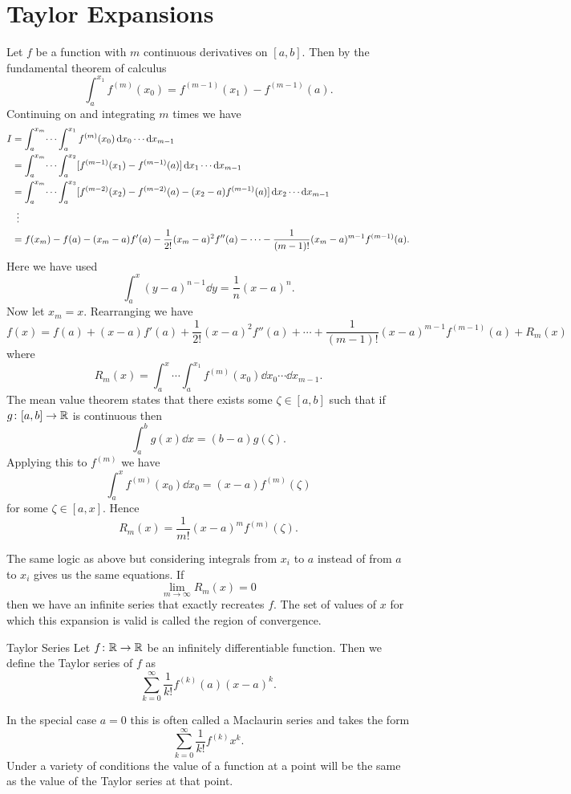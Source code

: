 \section{Taylor Expansions}
Let \(f\) be a function with \(m\) continuous derivatives on \([a, b]\).
Then by the fundamental theorem of calculus
\[\int_a^{x_1}f^{(m)}(x_0) = f^{(m-1)}(x_1) - f^{(m-1)}(a).\]
Continuing on and integrating \(m\) times we have
\begin{align*}
    I &= \int_{a}^{x_m} \dotsi \int_{a}^{x_1} f^{(m)}(x_0)\dd{x_0}\dotsm\dd{x_{m-1}}\\
    &= \int_{a}^{x_m} \dotsi \int_{a}^{x_2} [f^{(m-1)}(x_1) - f^{(m-1)}(a)]\dd{x_1}\dotsm\dd{x_{m-1}}\\
    &= \int_{a}^{x_m} \dotsi \int_{a}^{x_3} [f^{(m-2)}(x_2) - f^{(m-2)}(a) - (x_2 - a)f^{(m-1)}(a)] \dd{x_2}\dotsm\dd{x_{m-1}}\\
    &\hspace{0.5em}\vdots\\
    &= f(x_m) - f(a) - (x_m - a)f'(a) - \frac{1}{2!}(x_m - a)^2f''(a) - \dotsb - \frac{1}{(m - 1)!}(x_m - a)^{m-1}f^{(m-1)}(a).
\end{align*}
Here we have used
\[\int_a^x (y - a)^{n-1} \dd{y} = \frac{1}{n}(x - a)^n.\]
Now let \(x_m = x\).
Rearranging we have
\[f(x) = f(a) + (x - a)f'(a) + \frac{1}{2!}(x - a)^2f''(a) + \dotsb + \frac{1}{(m - 1)!}(x - a)^{m - 1}f^{(m - 1)}(a) + R_m(x)\]
where
\[R_m(x) = \int_a^x\dotsi\int_a^{x_1} f^{(m)}(x_0)\dd{x_0}\dotsm\dd{x_{m-1}}.\]
The mean value theorem states that there exists some \(\zeta\in[a, b]\) such that if \(g\colon[a, b]\to\mathbb{R}\) is continuous then
\[\int_a^b g(x)\dd{x} = (b - a)g(\zeta).\]
Applying this to \(f^{(m)}\) we have
\[\int_a^x f^{(m)}(x_0) \dd{x_0} = (x - a)f^{(m)}(\zeta)\]
for some \(\zeta\in[a, x]\).
Hence
\[R_m(x) = \frac{1}{m!}(x - a)^mf^{(m)}(\zeta).\]

The same logic as above but considering integrals from \(x_i\) to \(a\) instead of from \(a\) to \(x_i\) gives us the same equations.
If
\[\lim_{m\to\infty} R_m(x) = 0\]
then we have an infinite series that exactly recreates \(f\).
The set of values of \(x\) for which this expansion is valid is called the region of convergence.
\begin{definition}{Taylor Series}{}
    Let \(f\colon\mathbb{R}\to\mathbb{R}\) be an infinitely differentiable function.
    Then we define the Taylor series of \(f\) as
    \[\sum_{k=0}^{\infty} \frac{1}{k!}f^{(k)}(a)(x - a)^k.\]
\end{definition}
In the special case \(a = 0\) this is often called a Maclaurin series and takes the form
\[\sum_{k=0}^{\infty} \frac{1}{k!}f^{(k)}x^k.\]
Under a variety of conditions the value of a function at a point will be the same as the value of the Taylor series at that point.

